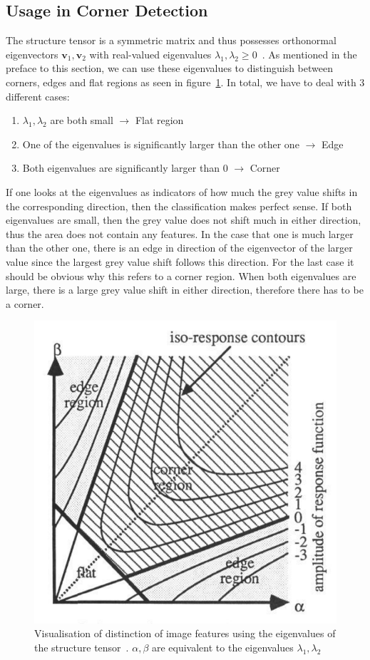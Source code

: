 \subsection{Usage in Corner Detection}\label{sub:Corner}
The structure tensor is a symmetric matrix and thus possesses orthonormal eigenvectors $\boldsymbol v_1,
\boldsymbol v_2$ with real-valued eigenvalues $\lambda_1, \lambda_2 \geq 0$~\cite{ipcv}. As
mentioned in the preface to this section, we can use these eigenvalues to distinguish between
corners, edges and flat regions as seen in figure~\ref{fig:Structure}.
In total, we have to deal with 3 different cases:
\begin{enumerate}
    \item $\lambda_1, \lambda_2$ are both small $\rightarrow$ Flat region
    \item One of the eigenvalues is significantly larger than the other one $\rightarrow$ Edge
    \item Both eigenvalues are significantly larger than 0 $\rightarrow$ Corner
\end{enumerate}
If one looks at the eigenvalues as indicators of how much the grey value shifts in the
corresponding
direction, then the classification makes perfect sense. If both eigenvalues are small, then the
grey value does not shift much in either direction, thus the area does not contain any features.
In the case that one is much larger than the other one, there is an edge in direction of the
eigenvector of the larger value since the largest grey value shift follows this direction.
For the last case it should be obvious why this refers to a corner region. When both eigenvalues
are large, there is a large grey value shift in either direction, therefore there has to be a
corner.\\
\begin{figure}[H]
    \centering
    \includegraphics[width=0.6\linewidth]{../Images/structure_tensor.png}
    \caption{Visualisation of distinction of image features using the eigenvalues of the structure
        tensor~\cite{harris88}. $\alpha, \beta$ are equivalent to the eigenvalues $\lambda_1, \lambda_2$}\label{fig:Structure}
\end{figure}
